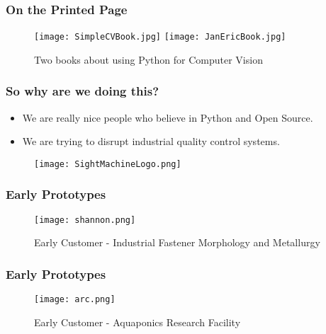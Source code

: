 \documentclass[compress]{beamer}
\begin{document}
\begin{frame}
\frametitle{On the Printed Page}

 \begin{figure}
     \texttt{[image: SimpleCVBook.jpg]}
     \quad
     \texttt{[image: JanEricBook.jpg]}
     \caption{Two books about using Python for Computer Vision}
 \end{figure}

\end{frame}

\begin{frame}
\frametitle{So why are we doing this?}

\begin{itemize}
  \item We are really nice people who believe in Python and Open
    Source.
  \item We are trying to disrupt industrial quality control systems.
\end{itemize}
\begin{figure}
  \texttt{[image: SightMachineLogo.png]}
\end{figure}

\end{frame}

\begin{frame}
\frametitle{Early Prototypes}

\begin{figure}
  \texttt{[image: shannon.png]}
  \caption{Early Customer - Industrial Fastener Morphology
      and Metallurgy }
\end{figure}

\end{frame}
\begin{frame}
\frametitle{Early Prototypes}

\begin{figure}
  \texttt{[image: arc.png]}
  \caption{Early Customer - Aquaponics Research Facility}
\end{figure}

\end{frame}
\end{document}

